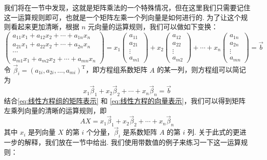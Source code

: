 我们将在一节中发现，这就是矩阵乘法的一个特殊情况，但在这里我们只需要记住这一运算规则即可，也就是一个矩阵左乘一个列向量是如何进行的. 为了让这个规则看起来更加清晰，根据 $n$ 元向量的运算规则，我们可以做如下变换：
\[\begin{pmatrix}
    a_{11} x_1 + a_{12} x_2 + \cdots + a_{1n} x_n \\
    a_{21} x_1 + a_{22} x_2 + \cdots + a_{2n} x_n \\
    \cdots\\
    a_{m1} x_1 + a_{m2} x_2 + \cdots + a_{mn} x_n
\end{pmatrix} = x_1 \begin{pmatrix}
    a_{11} \\ a_{21} \\ \vdots \\ a_{m1}
\end{pmatrix} + x_2 \begin{pmatrix}
    a_{12} \\ a_{22} \\ \vdots \\ a_{m2}
\end{pmatrix} + \cdots + x_n \begin{pmatrix}
    a_{1n} \\ a_{2n} \\ \vdots \\ a_{mn}
\end{pmatrix} = \vec{b}\]
令 $\vec{\beta}_i = (a_{1i},a_{2i},\ldots,a_{mi})^\mathrm{T}$，即方程组系数矩阵 $A$ 的某一列，则方程组可以简记为
\begin{equation} \label{eq:线性方程的向量表示}
    x_1\vec{\beta}_1 + x_2\vec{\beta}_2 + \cdots + x_n\vec{\beta}_n = \vec{b}
\end{equation}
结合\eqref{eq:线性方程组的矩阵表示} 和 \eqref{eq:线性方程的向量表示}，我们可以得到矩阵左乘列向量的清晰的运算规则，即
\begin{equation} \label{eq:矩阵左乘列向量}
    AX =  x_1\vec{\beta}_1 + x_2\vec{\beta}_2 + \cdots + x_n\vec{\beta}_n
\end{equation}
其中 $x_i$ 是列向量 $X$ 的第 $i$ 个分量，$\vec{\beta}_i$ 是系数矩阵 $A$ 的第 $i$ 列. 关于此式的更进一步的解释，我们放在一节中给出. 我们使用带数值的例子来练习一下这一运算规则：
